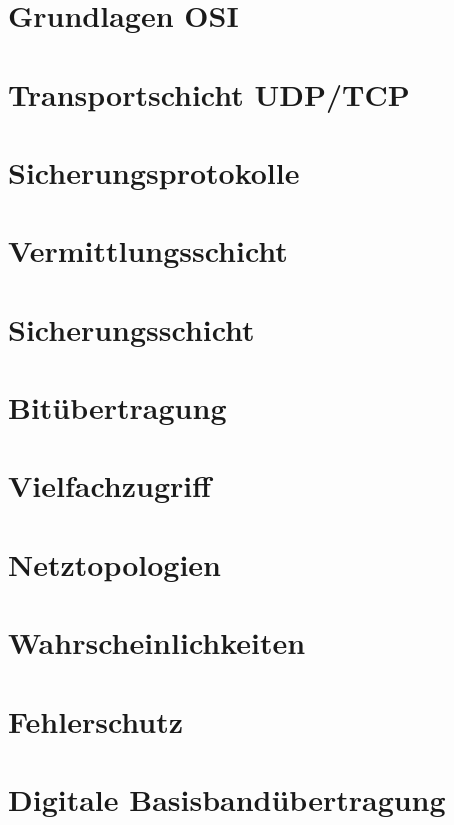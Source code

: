 \chapter{Grundlagen OSI}


\chapter{Transportschicht UDP/TCP}


\chapter{Sicherungsprotokolle}


\chapter{Vermittlungsschicht}


\chapter{Sicherungsschicht}


\chapter{Bitübertragung}


\chapter{Vielfachzugriff}


\chapter{Netztopologien}


\chapter{Wahrscheinlichkeiten}


\chapter{Fehlerschutz}


\chapter{Digitale Basisbandübertragung}



